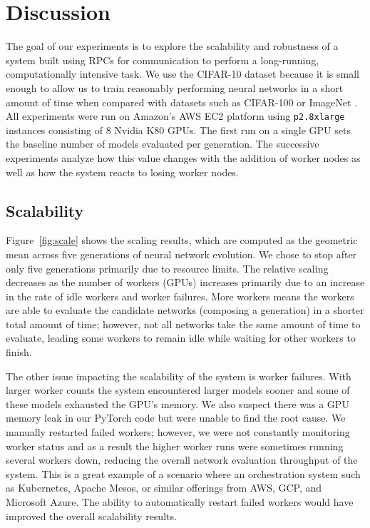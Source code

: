 \documentclass[conference]{IEEEtran}
\begin{document}
\section{Discussion}
The goal of our experiments is to explore the scalability and robustness
of a system built using RPCs for communication to perform a long-running,
computationally intensive task. We use the CIFAR-10 \cite{cifar10-data}
dataset because it is small enough to allow us to train reasonably
performing neural networks in a short amount of time when compared with
datasets such as CIFAR-100 \cite{cifar100-data} or ImageNet \cite{imagenet_cvpr09}.
All experiments were run on Amazon's
AWS EC2 platform using \texttt{p2.8xlarge} instances consisting of 8
Nvidia K80 GPUs. The first run on a single GPU sets the baseline
number of models evaluated per generation. The successive experiments
analyze how this value changes with the addition of worker nodes as well
as how the system reacts to losing worker nodes.
\subsection{Scalability}
Figure~\ref{fig:scale} shows the scaling results, which are computed as the
geometric mean across five generations of neural network evolution. We chose to
stop after only five generations primarily due to resource limits.  The relative
scaling decreases as the number of workers (GPUs) increases primarily due to an
increase in the rate of idle workers and worker failures. More workers means the
workers are able to evaluate the candidate networks (composing a generation) in
a shorter total amount of time; however, not all networks take the same amount
of time to evaluate, leading some workers to remain idle while waiting for other
workers to finish.

The other issue impacting the scalability of the system is worker
failures. With larger worker counts the system encountered larger models
sooner and some of these models exhausted the GPU's memory. We also
suspect there was a GPU memory leak in our PyTorch code but were unable
to find the root cause. We manually restarted failed workers; however,
we were not constantly monitoring worker status and as a result the higher
worker runs were sometimes running several workers down, reducing the overall
network evaluation throughput of the system. This is a great
example of a scenario where an orchestration system such as Kubernetes,
Apache Mesos, or similar offerings from AWS, GCP, and Microsoft Azure.
The ability to automatically restart failed workers would have improved
the overall scalability results.
\end{document}
